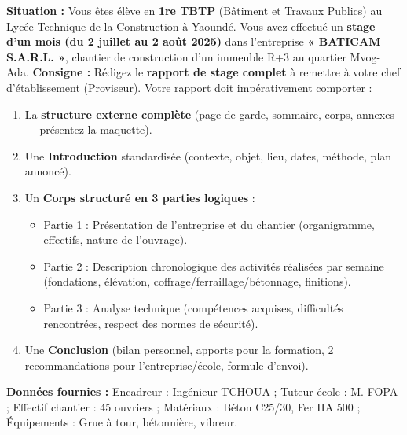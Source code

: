 \documentclass[11pt]{article}
\begin{document}
\begin{exercice}
\textbf{Situation :} Vous êtes élève en \textbf{1re TBTP} (Bâtiment et Travaux Publics) au Lycée Technique de la Construction à Yaoundé. Vous avez effectué un \textbf{stage d'un mois (du 2 juillet au 2 août 2025)} dans l'entreprise \textbf{« BATICAM S.A.R.L. »}, chantier de construction d'un immeuble R+3 au quartier Mvog-Ada.
\textbf{Consigne :} Rédigez le \textbf{rapport de stage complet} à remettre à votre chef d'établissement (Proviseur). Votre rapport doit impérativement comporter :
\begin{enumerate}
    \item La \textbf{structure externe complète} (page de garde, sommaire, corps, annexes — présentez la maquette).
    \item Une \textbf{Introduction} standardisée (contexte, objet, lieu, dates, méthode, plan annoncé).
    \item Un \textbf{Corps structuré en 3 parties logiques} :
        \begin{itemize}
            \item Partie 1 : Présentation de l'entreprise et du chantier (organigramme, effectifs, nature de l'ouvrage).
            \item Partie 2 : Description chronologique des activités réalisées par semaine (fondations, élévation, coffrage/ferraillage/bétonnage, finitions).
            \item Partie 3 : Analyse technique (compétences acquises, difficultés rencontrées, respect des normes de sécurité).
        \end{itemize}
    \item Une \textbf{Conclusion} (bilan personnel, apports pour la formation, 2 recommandations pour l'entreprise/école, formule d'envoi).
\end{enumerate}
\textbf{Données fournies :} Encadreur : Ingénieur TCHOUA ; Tuteur école : M. FOPA ; Effectif chantier : 45 ouvriers ; Matériaux : Béton C25/30, Fer HA 500 ; Équipements : Grue à tour, bétonnière, vibreur.
\end{exercice}
\end{document}
